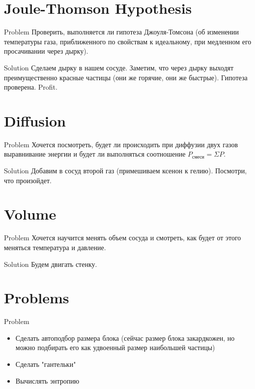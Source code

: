 \documentclass{beamer}
\begin{document}
\section{Joule-Thomson Hypothesis}

\begin{frame}[fragile]{Problem}
  Проверить, выполняется ли гипотеза Джоуля-Томсона (об изменении температуры газа, приближенного по
  свойствам к идеальному, при медленном его просачивании через дырку).
\end{frame}

\begin{frame}[fragile]{Solution}
  Сделаем дырку в нашем сосуде.
  \newline
  \newline
  \pause
  Заметим, что через дырку выходят преимущественно красные частицы (они же горячие, они же быстрые).
  \newline
  \newline
  \pause
  Гипотеза проверена. Profit.
\end{frame}

\section{Diffusion}

\begin{frame}[fragile]{Problem}
  Хочется посмотреть, будет ли происходить при диффузии двух газов выравнивание энергии
  и будет ли выполняться соотношение $P_{\text{смеси}} = \Sigma P$.
\end{frame}

\begin{frame}[fragile]{Solution}
  Добавим в сосуд второй газ (примешиваем ксенон к гелию). Посмотри, что произойдет.
\end{frame}

\section{Volume}

\begin{frame}[fragile]{Problem}
  Хочется научится менять объем сосуда и смотреть, как будет от этого меняться температура и
  давление.
\end{frame}

\begin{frame}[fragile]{Solution}
  Будем двигать стенку.
\end{frame}

\section{Problems}

\begin{frame}[fragile]{Problem}
  \begin{itemize}
    \item <1-> Сделать автоподбор размера блока (сейчас размер блока закардкожен, но можно
    подбирать его как удвоенный размер наибольшей частицы)
    \item <2-> Сделать "гантельки"
    \item <3-> Вычислять энтропию
  \end{itemize}
\end{frame}
\end{document}
